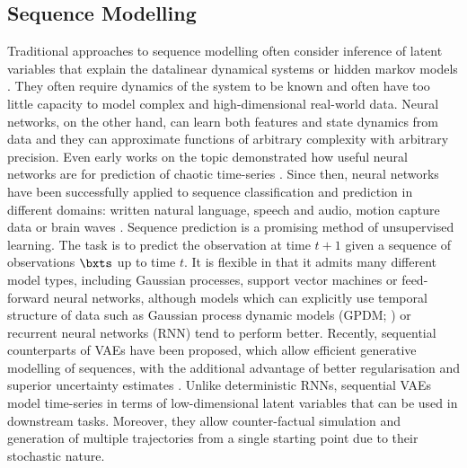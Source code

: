     \subsection{Sequence Modelling}
    \label{sec:seq_model}
    
        Traditional approaches to sequence modelling often consider inference of latent variables that explain the data\eg linear dynamical systems or hidden markov models \citep{Bishop2006}.
        They often require dynamics of the system to be known and often have too little capacity to model complex and high-dimensional real-world data.
        Neural networks, on the other hand, can learn both features and state dynamics from data and they can approximate functions of arbitrary complexity with arbitrary precision.
        Even early works on the topic demonstrated how useful neural networks are for prediction of chaotic time-series \citep{Lapedes1988}.
        Since then, neural networks have been successfully applied to sequence classification and prediction in different domains: written natural language, speech and audio, motion capture data or brain waves \citep{Langkvist2014}.
%
%
        Sequence prediction is a promising method of unsupervised learning. The task is to predict the observation at time $t+1$ given a sequence of observations $\bxts$ up to time $t$. It is flexible in that it admits many different model types, including Gaussian processes, support vector machines or feed-forward neural networks, although models which can explicitly use temporal structure of data such as Gaussian process dynamic models (GPDM; \cite{Wang2008}) or recurrent neural networks (RNN) tend to perform better. Recently, sequential counterparts of VAEs have been proposed, which allow efficient generative modelling of sequences, with the additional advantage of better regularisation and superior uncertainty estimates \citep{Fabius2015,Bayer2015,Karl2017,Fortunato2017}. Unlike deterministic RNNs, sequential VAEs model time-series in terms of low-dimensional latent variables that can be used in downstream tasks. Moreover, they allow counter-factual simulation and generation of multiple trajectories from a single starting point due to their stochastic nature.
%        
%      
